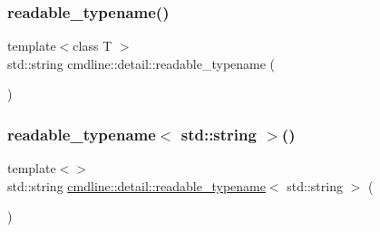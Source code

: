 \mbox{\label{namespacecmdline_1_1detail_a9e3c4f02792dba7836cb5d933bf8665f}} 
\subsubsection{\texorpdfstring{readable\_typename()}{readable\_typename()}}
{\footnotesize\ttfamily template$<$class T $>$ \\
std\+::string cmdline\+::detail\+::readable\+\_\+typename (\begin{DoxyParamCaption}{ }\end{DoxyParamCaption})}

\mbox{\label{namespacecmdline_1_1detail_aeaaa18e134cb1066b14d447a43c6386e}} 
\subsubsection{\texorpdfstring{readable\_typename$<$ std::string $>$()}{readable\_typename< std::string >()}}
{\footnotesize\ttfamily template$<$$>$ \\
std\+::string \mbox{\hyperlink{namespacecmdline_1_1detail_a9e3c4f02792dba7836cb5d933bf8665f}{cmdline\+::detail\+::readable\+\_\+typename}}$<$ std\+::string $>$ (\begin{DoxyParamCaption}{ }\end{DoxyParamCaption})\hspace{0.3cm}{\ttfamily [inline]}}

